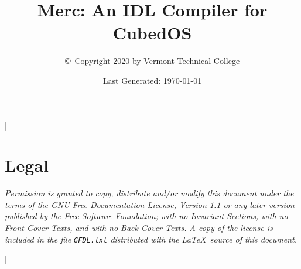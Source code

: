 \documentclass{scrreprt}
\begin{document}
\title{Merc: An IDL Compiler for CubedOS}
\author{\copyright\ Copyright 2020 by Vermont Technical College}
\date{Last Generated: \today}
\maketitle

\tableofcontents

\lstMakeShortInline|

\section*{Legal}
\label{sec:legal}

\textit{Permission is granted to copy, distribute and/or modify this document under the terms of
  the GNU Free Documentation License, Version 1.1 or any later version published by the Free
  Software Foundation; with no Invariant Sections, with no Front-Cover Texts, and with no
  Back-Cover Texts. A copy of the license is included in the file \texttt{GFDL.txt} distributed
  with the \LaTeX\ source of this document.}





\lstDeleteShortInline|




\end{document}

